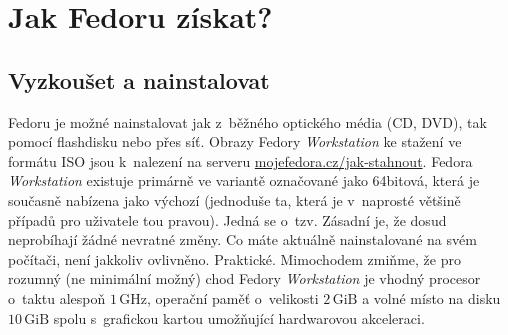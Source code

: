 \chapter*{Jak Fedoru získat?}

\section*{Vyzkoušet a nainstalovat}
Fedoru je možné nainstalovat jak z~běžného optického média (CD, DVD), tak pomocí flashdisku nebo přes síť. Obrazy Fedory \emph{Workstation} ke stažení ve formátu ISO jsou k~nalezení na serveru \url{mojefedora.cz/jak-stahnout}. Fedora \emph{Workstation} existuje primárně ve variantě označované jako 64bitová, která je současně nabízena jako výchozí (jednoduše ta, která je v~naprosté většině případů pro uživatele tou pravou). Jedná se o~tzv.  Zásadní je, že dosud neprobíhají žádné nevratné změny. Co máte aktuálně nainstalované na svém počítači, není jakkoliv ovlivněno. Praktické. Mimochodem zmiňme, že pro rozumný (ne minimální možný) chod Fedory \emph{Workstation} je vhodný procesor o~taktu alespoň $1\,\mathrm{GHz}$, operační paměť o~velikosti $2\,\mathrm{GiB}$ a volné místo na disku $10\,\mathrm{GiB}$ spolu s~grafickou kartou umožňující hardwarovou akceleraci.

